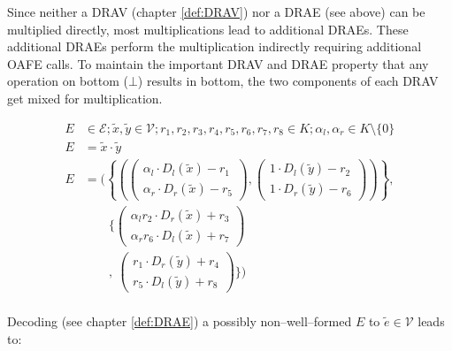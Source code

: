 Since neither a DRAV (chapter \ref{def:DRAV}) nor a DRAE (see above) can be
multiplied directly, most multiplications lead to additional DRAEs. These
additional DRAEs perform the multiplication indirectly requiring additional OAFE
calls. To maintain the important DRAV and DRAE property that any operation on
bottom ($\bot$) results in bottom, the two components of each DRAV get mixed for
multiplication.




\begin{align*}
  E & \in \mathcal{E}; \widetilde{x}, \widetilde{y} \in \mathcal{V};
  r_1, r_2, r_3, r_4, r_5, r_6, r_7, r_8 \in K;
  \alpha_l, \alpha_r \in K \setminus \{0\} \\
  E & = \widetilde{x} \cdot \widetilde{y} \\
  E & = \Bigg(\left\{\left(
            \begin{pmatrix}
              \alpha_l \cdot D_l(\widetilde{x}) - r_1 \\
              \alpha_r \cdot D_r(\widetilde{x}) - r_5
            \end{pmatrix},
            \begin{pmatrix}
              1        \cdot D_l(\widetilde{y}) - r_2 \\
              1        \cdot D_r(\widetilde{y}) - r_6
            \end{pmatrix}
        \right)\right\}, \\
    &   \qquad\bigg\{
        \begin{pmatrix}
            \alpha_lr_2 \cdot D_r(\widetilde{x}) + r_3 \\
            \alpha_rr_6 \cdot D_l(\widetilde{x}) + r_7
          \end{pmatrix} \\
    &  \qquad,
        \ \begin{pmatrix}
            r_1        \cdot D_r(\widetilde{y}) + r_4 \\
            r_5        \cdot D_l(\widetilde{y}) + r_8
          \end{pmatrix}
        \bigg\}\Bigg) \\
\end{align*}

Decoding (see chapter \ref{def:DRAE}) a possibly non--well--formed $E$ to
$\widetilde{e} \in \mathcal{V}$ leads to:

